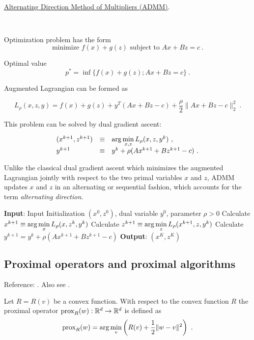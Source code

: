 \

\underline{Alternating Direction Method of Multipliers (ADMM)}.

\

Optimization problem has the form
$$\text{minimize } f(x)+g(z) \text{ subject to } Ax+Bz=c \ .$$

Optimal value 
$$p^*=\inf\{f(x)+g(z); Ax+Bz=c\} \ .$$

Augmented Lagrangian can be formed as 

$$L_{\rho}(x,z,y)=f(x)+g(z)+y^T(Ax+Bz-c)+\dfrac{\rho}{2}\|Ax+Bz-c\|_2^2 \ .$$

This problem can be solved by dual gradient ascent: 

$$\begin{array}{lll}
(x^{k+1}, z^{k+1}) & \equiv & \arg\min\limits_{x,z}L_{\rho}(x,z,y^k) \ , \\
y^{k+1} & \equiv & y^k+\rho(A x^{k+1}+B z^{k+1}-c) \ .
\end{array}$$

Unlike the classical dual gradient ascent which minimizes the augmented Lagrangian jointly with respect to 
the two primal variables $x$ and $z$, ADMM updates $x$ and $z$ in an alternating or sequential fashion, which accounts 
for the term \textit{alternating direction}.  

\begin{algorithm}[H]
\caption{Alternating Direction Method of Multipliers}
\label{Alg:ADMM}
\begin{algorithmic}[1]
\STATE \textbf{Input}: Input Initialization $(x^0, z^0)$, dual variable $y^0$, parameter $\rho>0$
    \STATE Calculate $x^{k+1}\equiv \arg\min\limits_{x} L_{\rho}(x, z^k, y^k)$
    \STATE Calculate $z^{k+1}\equiv \arg\min\limits_{z} L_{\rho}(x^{k+1}, z, y^k)$
    \STATE Calculate $y^{k+1}=y^k+\rho(Ax^{k+1}+Bz^{k+1}-c)$
\ENDFOR
\STATE \textbf{Output}: $(x^K, z^K)$
\end{algorithmic}
\end{algorithm}

\subsection{Proximal operators and proximal algorithms}

Reference: \cite{PrkishBoydProximal}. Also see \cite{BoydProximalNotes}.

Let $R=R(v)$ be a convex function. With respect to the convex function $R$ 
the proximal operator $\text{prox}_R(w): \mathbb R^d\rightarrow \mathbb R^d$ is defined as 
$$\text{prox}_R(w)=\arg\min\limits_{v}\left(R(v)+\dfrac{1}{2}\|w-v\|^2\right) \ .$$

